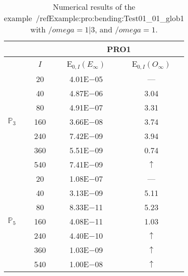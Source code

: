 \begin{table}[H]
\caption{Numerical results of the example~/ref{Example:pro:bending:Test01_01_glob1} with $/omega=1|3$, and $/omega=1$.}
\setlength{\tabcolsep}{5pt}
\centering
\begin{tabular}{@{}l c c c@{}}
\toprule
 &  & \multicolumn{2}{c}{PRO1}\\
\midrule
 & $I$ & E$_{0,I}(E_{\infty})$ & E$_{0,I}(O_{\infty})$\\
\midrule
\multirow{7}{*}{$\mathbb{P}_{3}$}
 & 20 & 4.01E$-$05 & ---\\
 & 40 & 4.87E$-$06 & 3.04\\
 & 80 & 4.91E$-$07 & 3.31\\
 & 160 & 3.66E$-$08 & 3.74\\
 & 240 & 7.42E$-$09 & 3.94\\
 & 360 & 5.51E$-$09 & 0.74\\
 & 540 & 7.41E$-$09 & $\uparrow$\\
\midrule
\multirow{7}{*}{$\mathbb{P}_{5}$}
 & 20 & 1.08E$-$07 & ---\\
 & 40 & 3.13E$-$09 & 5.11\\
 & 80 & 8.33E$-$11 & 5.23\\
 & 160 & 4.08E$-$11 & 1.03\\
 & 240 & 4.40E$-$10 & $\uparrow$\\
 & 360 & 1.03E$-$09 & $\uparrow$\\
 & 540 & 1.00E$-$08 & $\uparrow$\\
\bottomrule
\end{tabular}
\label{Table:pRO:test_01_01_test2_pro3}
\end{table}
